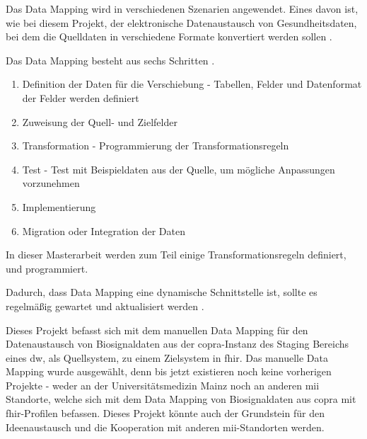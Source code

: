 Das Data Mapping wird in verschiedenen Szenarien angewendet. Eines davon ist, wie bei diesem Projekt, der elektronische Datenaustausch von Gesundheitsdaten, bei dem die Quelldaten in verschiedene Formate konvertiert werden sollen \cite{datamappingastera}.

Das Data Mapping besteht aus sechs Schritten \cite{datamappingtalend}. 
\begin{enumerate}
  \item Definition der Daten für die Verschiebung - Tabellen, Felder und Datenformat der Felder werden definiert
  \item Zuweisung der Quell- und Zielfelder
  \item Transformation - Programmierung der Transformationsregeln
  \item Test - Test mit Beispieldaten aus der Quelle, um mögliche Anpassungen vorzunehmen
  \item Implementierung 
  \item Migration oder Integration der Daten
\end{enumerate}

In dieser Masterarbeit werden zum Teil einige Transformationsregeln definiert, und programmiert.

Dadurch, dass Data Mapping eine dynamische Schnittstelle ist, sollte es regelmäßig gewartet und aktualisiert werden \cite{datamappingtalend}.

Dieses Projekt befasst sich mit dem manuellen Data Mapping für den Datenaustausch von Biosignaldaten aus der \ac{copra}-Instanz des Staging Bereichs eines \ac{dw}, als Quellsystem, zu einem Zielsystem in \ac{fhir}. Das manuelle Data Mapping wurde ausgewählt, denn bis jetzt existieren noch keine vorherigen Projekte - weder an der Universitätsmedizin Mainz noch an anderen \ac{mii} Standorte, welche sich mit dem Data Mapping von Biosignaldaten aus \ac{copra} mit \ac{fhir}-Profilen befassen. Dieses Projekt könnte auch der Grundstein für den Ideenaustausch und die Kooperation mit anderen \ac{mii}-Standorten werden.
